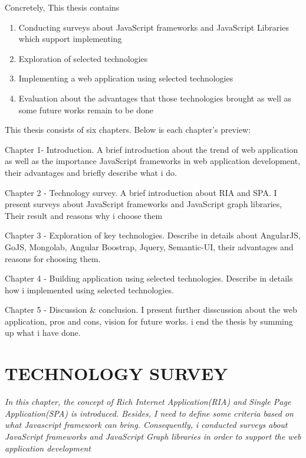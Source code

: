 \documentclass[14pt,a4paper]{extreport}
\begin{document}
Concretely, This thesis contains
\begin{enumerate}
\item Conducting surveys about JavaScript frameworks and JavaScript Libraries which support implementing 
\item Exploration of selected technologies
\item Implementing a web application using selected technologies
\item Evaluation about the advantages that those technologies brought as well as some future works remain to be done
\end{enumerate}
This thesis consists of six chapters. Below is each chapter’s preview:
\begin{list}{•}{•}

\item  Chapter 1- Introduction. A brief introduction about the trend of web application as well as the importance JavaScript frameworks in web application development, their advantages and briefly describe what i do.

\item Chapter 2 - Technology survey. A brief introduction about RIA and SPA. I present surveys about JavaScript frameworks and JavaScript graph libraries, Their result and reasons why i choose them

\item Chapter 3 - Exploration of key technologies. Describe in details about AngularJS, GoJS, Mongolab, Angular Boostrap, Jquery, Semantic-UI, their advantages and reasons for choosing them.

\item Chapter 4 - Building application using selected technologies. Describe in details how i implemented using selected technologies.

\item Chapter 5 - Discussion \& conclusion. I present further disscussion about the web application, pros and cons, vision for future works. i end the thesis by summing up what i have done.

\end{list}

\chapter{TECHNOLOGY SURVEY }
	\textsl{In this chapter, the concept of Rich Internet Application(RIA) and Single Page Application(SPA) is introduced. Besides, I need to define some criteria based on what Javascript framework can bring. Consequently, i conducted surveys about JavaScript frameworks and JavaScript Graph libraries in order to support the web application development}
	\newpage 
\end{document}
